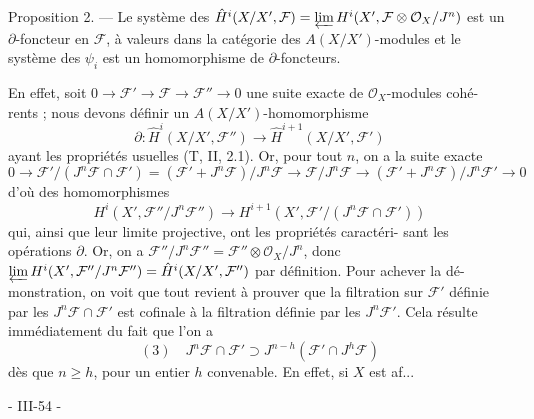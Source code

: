 Proposition 2. — Le système des $\hat{H}^i(X/X', \mathcal{F}) = \varprojlim H^i(X', \mathcal{F} \otimes \mathcal{O}_X/J^n)$ est
un $\partial$-foncteur en $\mathcal{F}$, à valeurs dans la catégorie des $A(X/X')$-modules
et le système des $\psi_i$ est un homomorphisme de $\partial$-foncteurs.

En effet, soit $0 \to \mathcal{F}' \to \mathcal{F} \to \mathcal{F}'' \to 0$ une suite exacte de $\mathcal{O}_X$-modules cohé-
rents ; nous devons définir un $A(X/X')$-homomorphisme
$$\partial : \hat{H}^i(X/X', \mathcal{F}'') \to \hat{H}^{i+1}(X/X', \mathcal{F}')$$
ayant les propriétés usuelles (T, II, 2.1). Or, pour tout $n$, on a
la suite exacte
$$0 \to \mathcal{F}' / (J^n\mathcal{F} \cap \mathcal{F}') = (\mathcal{F}' + J^n\mathcal{F}) / J^n\mathcal{F} \to \mathcal{F} / J^n\mathcal{F} \to (\mathcal{F}' + J^n\mathcal{F}) / J^n\mathcal{F}' \to 0$$
d'où des homomorphismes
$$H^i(X', \mathcal{F}'' / J^n\mathcal{F}'') \to H^{i+1}(X', \mathcal{F}' / (J^n\mathcal{F} \cap \mathcal{F}'))$$
qui, ainsi que leur limite projective, ont les propriétés caractéri-
sant les opérations $\partial$. Or, on a $\mathcal{F}'' / J^n\mathcal{F}'' = \mathcal{F}'' \otimes \mathcal{O}_X/J^n$, donc
$\varprojlim H^i(X', \mathcal{F}'' / J^n\mathcal{F}'') = \hat{H}^i(X/X', \mathcal{F}'')$ par définition. Pour achever la dé-
monstration, on voit que tout revient à prouver que la filtration
sur $\mathcal{F}'$ définie par les $J^n\mathcal{F} \cap \mathcal{F}'$ est cofinale à la filtration définie
par les $J^n\mathcal{F}'$. Cela résulte immédiatement du fait que l'on a
$$(3) \quad J^n\mathcal{F} \cap \mathcal{F}' \supset J^{n-h}(\mathcal{F}' \cap J^h\mathcal{F})$$
dès que $n \ge h$, pour un entier $h$ convenable. En effet, si $X$ est af...

\newpage


- III-54 -

